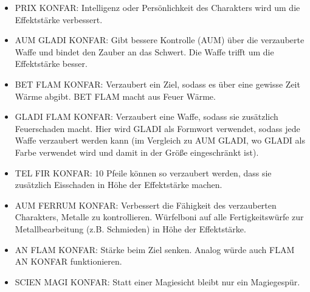 \documentclass{article}
\begin{document}
\begin{itemize}
\item PRIX KONFAR: Intelligenz oder Persönlichkeit des Charakters wird um die Effektstärke verbessert.
\item AUM GLADI KONFAR: Gibt bessere Kontrolle (AUM) über die verzauberte Waffe und bindet den Zauber an das Schwert. Die Waffe trifft um die Effektstärke besser.
\item BET FLAM KONFAR: Verzaubert ein Ziel, sodass es über eine gewisse Zeit Wärme abgibt. BET FLAM macht aus Feuer Wärme.
\item GLADI FLAM KONFAR: Verzaubert eine Waffe, sodass sie zusätzlich Feuerschaden macht. Hier wird GLADI als Formwort verwendet, sodass jede Waffe verzaubert werden kann (im Vergleich zu AUM GLADI, wo GLADI als Farbe verwendet wird und damit in der Größe eingeschränkt ist).
\item TEL FIR KONFAR: 10 Pfeile können so verzaubert werden, dass sie zusätzlich Eisschaden in Höhe der Effektstärke machen.
\item AUM FERRUM KONFAR: Verbessert die Fähigkeit des verzauberten Charakters, Metalle zu kontrollieren. Würfelboni auf alle Fertigkeitswürfe zur Metallbearbeitung (z.B. Schmieden) in Höhe der Effektstärke.
\item AN FLAM KONFAR: Stärke beim Ziel senken. Analog würde auch FLAM AN KONFAR funktionieren.
\item SCIEN MAGI KONFAR: Statt einer Magiesicht bleibt nur ein Magiegespür.
\end{itemize}
\end{document}
